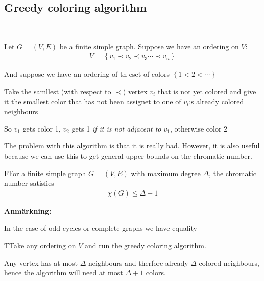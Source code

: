 \subsection{Greedy coloring algorithm}\hfill\\\par
\noindent Let $G = (V,E)$ be a finite simple graph. Suppose we have an ordering on $V$:
\begin{equation*}
  \begin{gathered}
  V = \left\{v_1\prec v_2\prec v_3\cdots\prec v_n\right\}
  \end{gathered}
\end{equation*}\par
\noindent And suppose we have an ordering of th eset of colors $\left\{1<2<\cdots\right\}$
\par\bigskip
\noindent Take the samllest (with respect to $\prec$) vertex $v_i$ that is not yet colored and give it the smallest color that has not been assignet to one of $v_i$:s already colored neighbours
\par\bigskip
\noindent So $v_1$ gets color 1, $v_2$ gets 1 \textit{if it is not adjacent to $v_1$}, otherwise color 2
\par\bigskip
\noindent The problem with this algorithm is that it is really bad. However, it is also useful because we can use this to get general upper bounds on the chromatic number.
\par\bigskip
\begin{lem}
  FFor a finite simple graph $G = (V,E)$  with maximum degree $\Delta$, the chromatic number satisfies
  \begin{equation*}
    \begin{gathered}
      \chi(G)\leq\Delta +1
    \end{gathered}
  \end{equation*}
\end{lem}
\par\bigskip
\noindent\textbf{Anmärkning:}\par
\noindent In the case of odd cycles or complete graphs we have equality 
\par\bigskip
\begin{prf}
  TTake any ordering on $V$ and run the greedy coloring algorithm.\par
  \noindent Any vertex has at most $\Delta$ neighbours and therfore already $\Delta$ colored neighbours, hence the algorithm will need at most $\Delta +1$ colors.
\end{prf}
\par\bigskip
